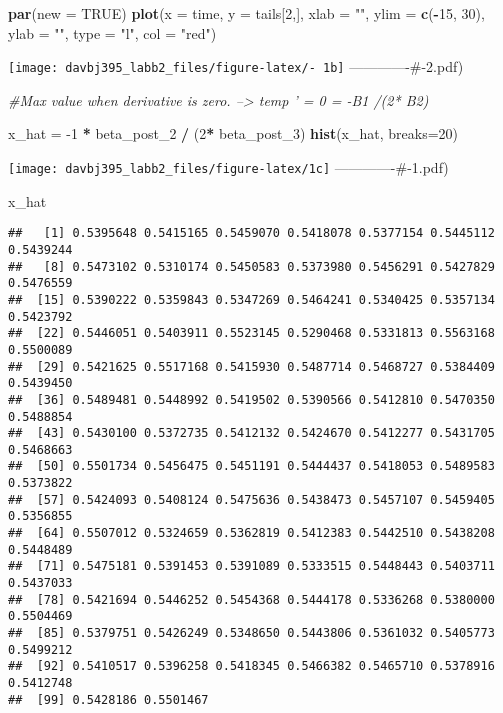 \documentclass[]{article}
\newenvironment{Shaded}{\begin{snugshade}}{\end{snugshade}}
\newcommand{\CommentTok}[1]{\textcolor[rgb]{0.56,0.35,0.01}{\textit{#1}}}
\newcommand{\DataTypeTok}[1]{\textcolor[rgb]{0.13,0.29,0.53}{#1}}
\newcommand{\DecValTok}[1]{\textcolor[rgb]{0.00,0.00,0.81}{#1}}
\newcommand{\KeywordTok}[1]{\textcolor[rgb]{0.13,0.29,0.53}{\textbf{#1}}}
\newcommand{\NormalTok}[1]{#1}
\newcommand{\OperatorTok}[1]{\textcolor[rgb]{0.81,0.36,0.00}{\textbf{#1}}}
\newcommand{\OtherTok}[1]{\textcolor[rgb]{0.56,0.35,0.01}{#1}}
\newcommand{\StringTok}[1]{\textcolor[rgb]{0.31,0.60,0.02}{#1}}
\begin{document}
\begin{Shaded}
\begin{Highlighting}[]
\KeywordTok{par}\NormalTok{(}\DataTypeTok{new =} \OtherTok{TRUE}\NormalTok{)}
\KeywordTok{plot}\NormalTok{(}\DataTypeTok{x =}\NormalTok{ time, }\DataTypeTok{y =}\NormalTok{ tails[}\DecValTok{2}\NormalTok{,], }\DataTypeTok{xlab =} \StringTok{""}\NormalTok{, }\DataTypeTok{ylim =} \KeywordTok{c}\NormalTok{(}\OperatorTok{-}\DecValTok{15}\NormalTok{, }\DecValTok{30}\NormalTok{), }\DataTypeTok{ylab =} \StringTok{""}\NormalTok{, }\DataTypeTok{type =} \StringTok{"l"}\NormalTok{, }\DataTypeTok{col =} \StringTok{"red"}\NormalTok{)}
\end{Highlighting}
\end{Shaded}

\texttt{[image: davbj395\_labb2\_files/figure-latex/- 1b]}
-------------\#-2.pdf)

\begin{Shaded}
\begin{Highlighting}[]
\CommentTok{#Max value when derivative is zero. --> temp ' = 0 = -B1 /(2* B2)}

\NormalTok{x_hat =}\StringTok{ }\DecValTok{-1} \OperatorTok{*}\StringTok{ }\NormalTok{beta_post_}\DecValTok{2} \OperatorTok{/}\StringTok{ }\NormalTok{(}\DecValTok{2}\OperatorTok{*}\StringTok{ }\NormalTok{beta_post_}\DecValTok{3}\NormalTok{) }
\KeywordTok{hist}\NormalTok{(x_hat, }\DataTypeTok{breaks=}\DecValTok{20}\NormalTok{)}
\end{Highlighting}
\end{Shaded}

\texttt{[image: davbj395\_labb2\_files/figure-latex/1c]}
-------------\#-1.pdf)

\begin{Shaded}
\begin{Highlighting}[]
\NormalTok{x_hat}
\end{Highlighting}
\end{Shaded}

\begin{verbatim}
##   [1] 0.5395648 0.5415165 0.5459070 0.5418078 0.5377154 0.5445112 0.5439244
##   [8] 0.5473102 0.5310174 0.5450583 0.5373980 0.5456291 0.5427829 0.5476559
##  [15] 0.5390222 0.5359843 0.5347269 0.5464241 0.5340425 0.5357134 0.5423792
##  [22] 0.5446051 0.5403911 0.5523145 0.5290468 0.5331813 0.5563168 0.5500089
##  [29] 0.5421625 0.5517168 0.5415930 0.5487714 0.5468727 0.5384409 0.5439450
##  [36] 0.5489481 0.5448992 0.5419502 0.5390566 0.5412810 0.5470350 0.5488854
##  [43] 0.5430100 0.5372735 0.5412132 0.5424670 0.5412277 0.5431705 0.5468663
##  [50] 0.5501734 0.5456475 0.5451191 0.5444437 0.5418053 0.5489583 0.5373822
##  [57] 0.5424093 0.5408124 0.5475636 0.5438473 0.5457107 0.5459405 0.5356855
##  [64] 0.5507012 0.5324659 0.5362819 0.5412383 0.5442510 0.5438208 0.5448489
##  [71] 0.5475181 0.5391453 0.5391089 0.5333515 0.5448443 0.5403711 0.5437033
##  [78] 0.5421694 0.5446252 0.5454368 0.5444178 0.5336268 0.5380000 0.5504469
##  [85] 0.5379751 0.5426249 0.5348650 0.5443806 0.5361032 0.5405773 0.5499212
##  [92] 0.5410517 0.5396258 0.5418345 0.5466382 0.5465710 0.5378916 0.5412748
##  [99] 0.5428186 0.5501467
\end{verbatim}
\end{document}
